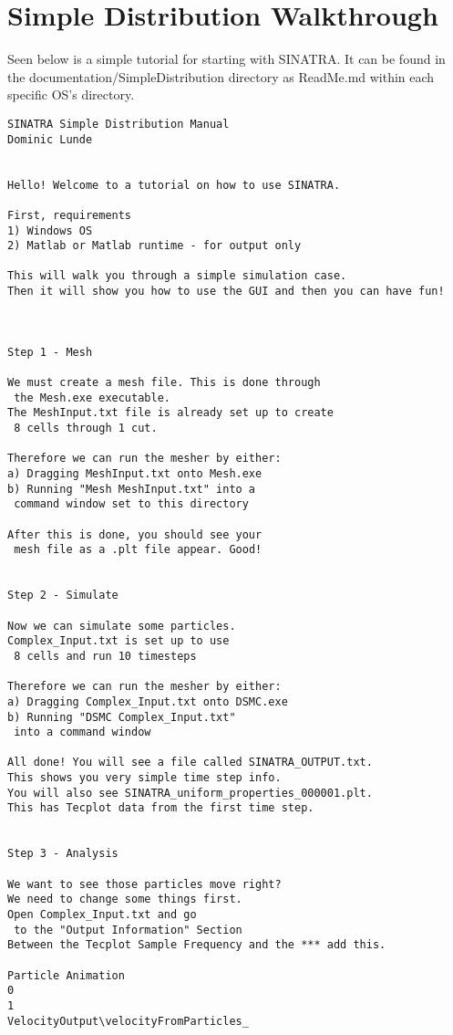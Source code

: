 \chapter{Simple Distribution Walkthrough}
\label{app:walkthrough}
Seen below is a simple tutorial for starting with SINATRA. It can be found in the documentation/SimpleDistribution directory as ReadMe.md within each specific OS's directory.

\begin{verbatim}
SINATRA Simple Distribution Manual
Dominic Lunde


Hello! Welcome to a tutorial on how to use SINATRA.

First, requirements
1) Windows OS
2) Matlab or Matlab runtime - for output only

This will walk you through a simple simulation case. 
Then it will show you how to use the GUI and then you can have fun!



Step 1 - Mesh

We must create a mesh file. This is done through
 the Mesh.exe executable.
The MeshInput.txt file is already set up to create
 8 cells through 1 cut.
 
Therefore we can run the mesher by either:
a) Dragging MeshInput.txt onto Mesh.exe
b) Running "Mesh MeshInput.txt" into a
 command window set to this directory

After this is done, you should see your
 mesh file as a .plt file appear. Good!


Step 2 - Simulate

Now we can simulate some particles. 
Complex_Input.txt is set up to use
 8 cells and run 10 timesteps

Therefore we can run the mesher by either:
a) Dragging Complex_Input.txt onto DSMC.exe
b) Running "DSMC Complex_Input.txt"
 into a command window

All done! You will see a file called SINATRA_OUTPUT.txt.
This shows you very simple time step info. 
You will also see SINATRA_uniform_properties_000001.plt.
This has Tecplot data from the first time step.


Step 3 - Analysis

We want to see those particles move right? 
We need to change some things first.
Open Complex_Input.txt and go
 to the "Output Information" Section
Between the Tecplot Sample Frequency and the *** add this.

Particle Animation
0
1
VelocityOutput\velocityFromParticles_


\end{verbatim}
